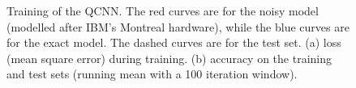 \begin{figure}
\begin{subfigure}{0.49\textwidth}
        \caption{}
        \label{fig:qcnn_acc}
    \end{subfigure}
    \caption{Training of the QCNN. The red curves are for the noisy model (modelled after IBM's Montreal hardware), while the blue curves are for the exact model. The dashed curves are for the test set. (a) loss (mean square error) during training. (b) accuracy on the training and test sets (running mean with a 100 iteration window).}
    \label{fig:qcnn_training}
\end{figure}


